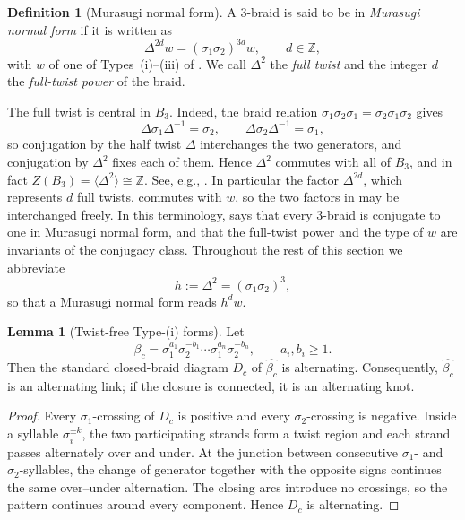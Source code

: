 \documentclass[11pt]{article}
\theoremstyle{definition}
\newtheorem{definition}[definition]{Definition}
\newtheorem{lemma}[lemma]{Lemma}
\begin{document}
\begin{definition}[Murasugi normal form]\label{def:murasugi_nf}
A $3$-braid is said to be in \emph{Murasugi normal form} if it is written as
\[
\Delta^{2d}w=(\sigma_{1}\sigma_{2})^{3d}w,\qquad d\in\mathbb{Z},
\]
with $w$ of one of Types~\textup{(i)}--\textup{(iii)} of .
We call $\Delta^{2}$ the \emph{full twist} and the integer $d$ the
\emph{full-twist power} of the braid.
\end{definition}

\noindent The full twist is central in $B_{3}$. Indeed, the braid relation
$\sigma_{1}\sigma_{2}\sigma_{1}=\sigma_{2}\sigma_{1}\sigma_{2}$ gives
\[
\Delta\sigma_{1}\Delta^{-1}=\sigma_{2},\qquad
\Delta\sigma_{2}\Delta^{-1}=\sigma_{1},
\]
so conjugation by the half twist $\Delta$ interchanges the two generators, and
conjugation by $\Delta^{2}$ fixes each of them. Hence $\Delta^{2}$ commutes with all of
$B_{3}$, and in fact $Z(B_{3})=\langle\Delta^{2}\rangle\cong\mathbb{Z}$. See, e.g.,
\cite[Theorem~1.24]{KasselTuraev}. In particular the
factor $\Delta^{2d}$, which represents $d$ full twists, commutes with $w$, so the two
factors in  may be interchanged freely. In this terminology,
 says that every $3$-braid is conjugate to one in Murasugi normal
form, and that the full-twist power and the type of $w$ are invariants of the conjugacy
class. Throughout the rest of this section we abbreviate
\[
h:=\Delta^{2}=(\sigma_{1}\sigma_{2})^{3},
\]
so that a Murasugi normal form reads $h^{d}w$.

\begin{lemma}[Twist-free Type-\textup{(i)} forms]\label{lem:alt-standard}
Let
\[
\beta_c=
\sigma_{1}^{a_1}\sigma_{2}^{-b_1}\cdots
\sigma_{1}^{a_n}\sigma_{2}^{-b_n},
\qquad a_i,b_i\ge1.
\]
Then the standard closed-braid diagram $D_c$ of $\widehat{\beta_c}$ is
alternating. Consequently, $\widehat{\beta_c}$ is an alternating link; if the
closure is connected, it is an alternating knot.
\end{lemma}

\begin{proof}
Every $\sigma_1$-crossing of $D_c$ is positive and every $\sigma_2$-crossing
is negative. Inside a syllable $\sigma_i^{\pm k}$, the two participating
strands form a twist region and each strand passes alternately over and under.
At the junction between consecutive $\sigma_1$- and $\sigma_2$-syllables, the
change of generator together with the opposite signs continues the same
over--under alternation. The closing arcs introduce no crossings, so the
pattern continues around every component. Hence $D_c$ is alternating.
\end{proof}
\end{document}
